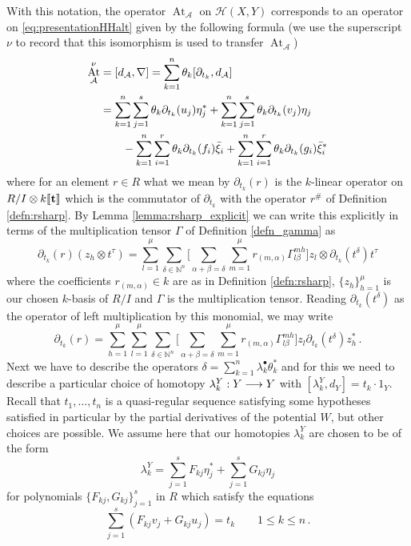 \documentclass[english,letter paper,12pt,leqno]{article}
\theoremstyle{example}
\numberwithin{equation}{section}
\def\AA{\mathcal{A}}
\def\HH{\HH}
\def\HH{\mathcal{H}}
\def\be{\begin{equation}}
\def\ee{\end{equation}}
\DeclareMathOperator{\vAt}{At}
\begin{document}
With this notation, the operator $\vAt_{\AA}$ on $\HH(X,Y)$ corresponds to an operator on \eqref{eq:presentationHHalt} given by the following formula (we use the superscript $\nu$ to record that this isomorphism is used to transfer $\vAt_{\AA}$) 
\begin{align}
\vAt^{\nu}_{\AA} &= [ d_{\AA}, \nabla ] = \sum_{k=1}^n \theta_k [ \partial_{t_k}, d_{\AA} ]\nonumber\\
&= \sum_{k=1}^n \sum_{j=1}^s \theta_k \partial_{t_k} (u_j) \eta_j^* + \sum_{k=1}^n \sum_{j=1}^s \theta_k \partial_{t_k}( v_j ) \eta_j\label{eq:vat_formula}\\
& \qquad - \sum_{k=1}^n \sum_{i=1}^r \theta_k \partial_{t_k}(f_i) \Bar{\xi}_i + \sum_{k=1}^n \sum_{i=1}^r \theta_k \partial_{t_k}(g_i) \Bar{\xi}_i^*\nonumber
\end{align}
where for an element $r \in R$ what we mean by $\partial_{t_k}(r)$ is the $k$-linear operator on $R/I \otimes k\llbracket \bold{t} \rrbracket$ which is the commutator of $\partial_{t_k}$ with the operator $r^{\#}$ of Definition \ref{defn:rsharp}. By Lemma \ref{lemma:rsharp_explicit} we can write this explicitly in terms of the multiplication tensor $\Gamma$ of Definition \ref{defn_gamma} as
\be
\partial_{t_k}(r)(z_h \otimes t^{\tau}) = \sum_{l=1}^\mu \sum_{\delta \in \mathbb{N}^n} \Big[ \sum_{\alpha + \beta = \delta } \sum_{m=1}^\mu r_{(m,\alpha)} \Gamma^{mh}_{l\beta} \Big] z_l \otimes \partial_{t_k}(t^\delta) t^{\tau}
\ee
where the coefficients $r_{(m,\alpha)} \in k$ are as in Definition \ref{defn:rsharp}, $\{ z_h \}_{h=1}^\mu$ is our chosen $k$-basis of $R/I$ and $\Gamma$ is the multiplication tensor. Reading $\partial_{t_k}(t^\delta)$ as the operator of left multiplication by this monomial, we may write
\be\label{eq:partial_derivative_op}
\partial_{t_k}(r) = \sum_{h=1}^\mu \sum_{l=1}^\mu \sum_{\delta \in \mathbb{N}^n} \Big[ \sum_{\alpha + \beta = \delta } \sum_{m=1}^\mu r_{(m,\alpha)} \Gamma^{mh}_{l\beta} \Big] z_l \partial_{t_k}(t^\delta) z_h^*\,.
\ee
Next we have to describe the operators $\delta = \sum_{k=1}^n \lambda^\bullet_k \theta_k^*$ and for this we need to describe a particular choice of homotopy $\lambda^Y_k: Y \longrightarrow Y$ with $[ \lambda^Y_k, d_Y ] = t_k \cdot 1_Y$. Recall that $t_1,\ldots,t_n$ is a quasi-regular sequence satisfying some hypotheses satisfied in particular by the partial derivatives of the potential $W$, but other choices are possible. We assume here that our homotopies $\lambda^Y_k$ are chosen to be of the form
\be\label{eq:formula_lambdak_koszul}
\lambda^Y_k = \sum_{j=1}^s F_{kj} \eta_j^* + \sum_{j=1}^s G_{kj} \eta_j
\ee
for polynomials $\{ F_{kj}, G_{kj} \}_{j=1}^s$ in $R$ which satisfy the equations
\[
\sum_{j=1}^s( F_{kj} v_j + G_{kj} u_j ) = t_k \qquad 1 \le k \le n\,.
\]
\end{document}
